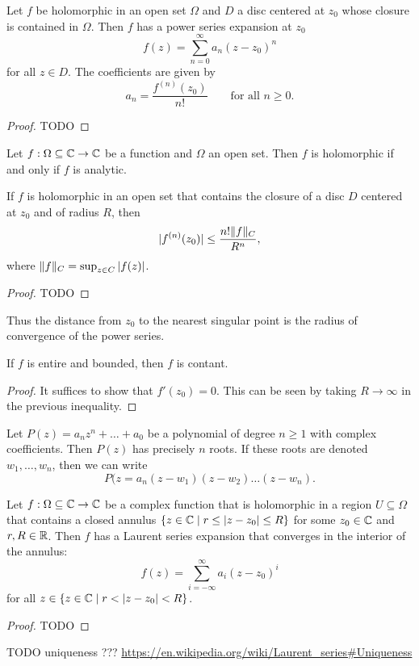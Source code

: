 \begin{proposition}
Let $f$ be holomorphic in an open set $\Omega$ and $D$ a
disc centered at $z_0$ whose closure is contained in $\Omega$. Then $f$ has a power series expansion at $z_0$
\[ f(z) = \sum_{n=0}^\infty a_n(z-z_0)^n \]
for all $z\in D$. The coefficients are given by
\[ a_n = \frac{f^{(n)}(z_0)}{n!} \qquad \text{for all $n\geq 0$}. \]
\end{proposition}
\begin{proof}
TODO
\end{proof}
\begin{corollary}
Let $f: \Omega\subseteq \mathbb{C} \to \mathbb{C}$ be a function and $\Omega$ an open set. Then $f$ is holomorphic \textup{if and only if} $f$ is analytic.
\end{corollary}
\begin{corollary}
If $f$ is holomorphic in an open
set that contains the closure of a disc $D$ centered at $z_0$ and of radius $R$,
then
\[  |f^{(n)}(z_0)| \leq \frac{n!\lVert f\rVert_C}{R^n}, \]
where $\lVert f\rVert_C = \sup_{z\in C}|f(z)|$.
\end{corollary}
\begin{proof}
TODO
\end{proof}
Thus the distance from $z_0$ to the nearest singular point is the radius of convergence of the power series.
\begin{corollary} \label{liouvilleTheoremAnalysis}
If $f$ is entire and bounded, then $f$ is contant.
\end{corollary}
\begin{proof}
It suffices to show that $f'(z_0) = 0$. This can be seen by taking $R\to\infty$ in the previous inequality.
\end{proof}
\begin{corollary}
Let $P(z) = a_nz^n + \ldots + a_0$ be a polynomial of degree $n\geq 1$ with complex coefficients. Then $P(z)$ has precisely $n$ roots. If these roots are denoted $w_1, \ldots, w_n$, then we can write
\[ P(z = a_n(z-w_1)(z-w_2)\ldots(z-w_n). \]
\end{corollary}

\begin{proposition}
Let $f: \Omega\subseteq \mathbb{C}\to \mathbb{C}$ be a complex function that is holomorphic in a region $U\subseteq \Omega$ that contains a closed annulus $\setbuilder{z\in \C}{r\leq|z-z_0|\leq R}$ for some $z_0\in \mathbb{C}$ and $r,R\in \mathbb{R}$. Then $f$ has a Laurent series expansion that converges in the interior of the annulus:
\[ f(z) = \sum_{i=-\infty}^\infty a_i(z-z_0)^i \]
for all $z\in \setbuilder{z\in \C}{r < |z-z_0| < R}$.
\end{proposition}
\begin{proof}
TODO
\end{proof}
TODO uniqueness ??? \url{https://en.wikipedia.org/wiki/Laurent_series#Uniqueness}

